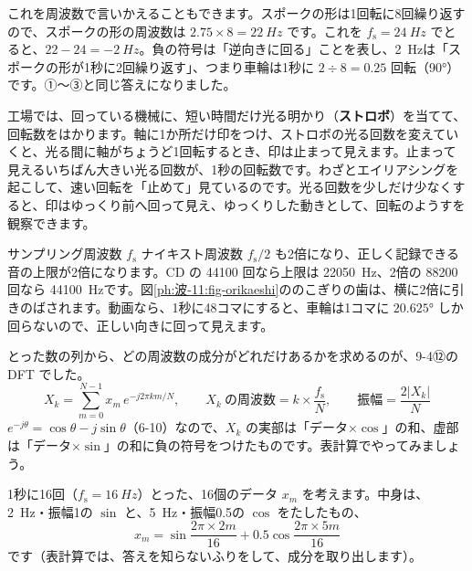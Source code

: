 \noindent これを周波数で言いかえることもできます。スポークの形は1回転に8回繰り返すので、スポークの形の周波数は $2.75\times8=\qty{22}{Hz}$ です。これを $f_{\mathrm s}=\qty{24}{Hz}$ でとると、$22-24=\qty{-2}{Hz}$。負の符号は「逆向きに回る」ことを表し、\qty{2}{Hz}は「スポークの形が1秒に2回繰り返す」、つまり車輪は1秒に $2\div8=0.25$ 回転（\ang{90}）です。①〜③と同じ答えになりました。

\begin{phmijika}[ストロボで回転数をはかる]
工場では、回っている機械に、短い時間だけ光る明かり（\textbf{ストロボ}）を当てて、回転数をはかります。軸に1か所だけ印をつけ、ストロボの光る回数を変えていくと、光る間に軸がちょうど1回転するとき、印は止まって見えます。止まって見えるいちばん大きい光る回数が、1秒の回転数です。わざとエイリアシングを起こして、速い回転を「止めて」見ているのです。光る回数を少しだけ少なくすると、印はゆっくり前へ回って見え、ゆっくりした動きとして、回転のようすを観察できます。
\end{phmijika}

\begin{phbaisuru}{サンプリング周波数 $f_{\mathrm s}$}
ナイキスト周波数 $f_{\mathrm s}/2$ も2倍になり、正しく記録できる音の上限が2倍になります。CD の \num{44100} 回なら上限は \qty{22050}{Hz}、2倍の \num{88200} 回なら \qty{44100}{Hz}です。図\ref{ph:波-11:fig-orikaeshi}ののこぎりの歯は、横に2倍に引きのばされます。動画なら、1秒に48コマにすると、車輪は1コマに $\ang{20.625}$ しか回らないので、正しい向きに回って見えます。
\end{phbaisuru}


\label{ph:波-11:sec3}
とった数の列から、どの周波数の成分がどれだけあるかを求めるのが、9-4⑫の DFT でした。
\[X_k=\sum_{m=0}^{N-1}x_m\,e^{-j2\pi km/N},\qquad X_k\ \text{の周波数}=k\times\frac{f_{\mathrm s}}{N},\qquad\text{振幅}=\frac{2|X_k|}{N}\]
$e^{-j\theta}=\cos\theta-j\sin\theta$（6-10）なので、$X_k$ の実部は「データ×$\cos$」の和、虚部は「データ×$\sin$」の和に負の符号をつけたものです。表計算でやってみましょう。

1秒に16回（$f_{\mathrm s}=\qty{16}{Hz}$）とった、16個のデータ $x_m$ を考えます。中身は、\qty{2}{Hz}・振幅1の $\sin$ と、\qty{5}{Hz}・振幅0.5の $\cos$ をたしたもの、
\[x_m=\sin\frac{2\pi\times2m}{16}+0.5\cos\frac{2\pi\times5m}{16}\]
です（表計算では、答えを知らないふりをして、成分を取り出します）。

